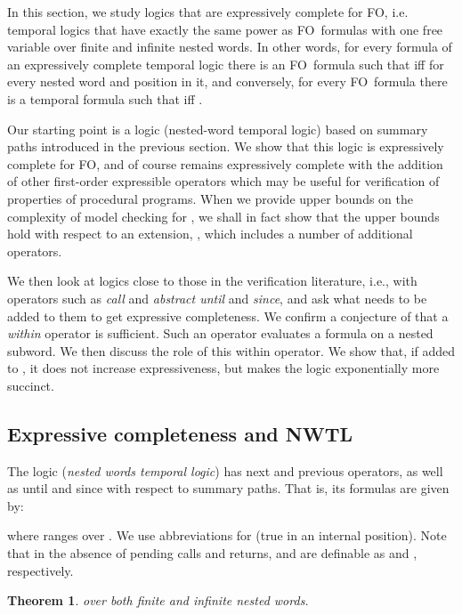 \documentclass{LMCS}
\newcommand{\FO}{{\rm FO}}
\theoremstyle{plain}
\newtheorem{theorem}{Theorem}[section]
\theoremstyle{definition}
\begin{document}
\noindent In this section, we study logics that are expressively complete for
\FO, i.e. temporal logics that have exactly the same power as \FO\
formulas with one free variable over finite and infinite nested words.
In other words, for every formula  of an expressively complete
temporal logic there is an \FO\ formula  such that
 iff  for every nested word 
and position  in it, and conversely, for every \FO\ formula  
there is a temporal formula  such that  iff
. 

Our starting point is a logic  (nested-word temporal logic) based
on summary paths introduced in the previous section. We show that this
logic is expressively complete for FO, and of course remains expressively
complete with the addition of other first-order expressible operators
which may be  useful for
verification of properties of procedural programs. 
When we provide upper bounds on the complexity of model checking
for , we shall in fact show that the upper bounds hold
with respect to an extension, ,  which includes
a number of additional operators.


We then look at logics close to those in the verification literature,
i.e., with operators such as {\em call} and {\em abstract until} and {\em since}, and ask
what needs to be added to them to get expressive completeness. We
confirm a conjecture of \cite{AEM04} that a {\em within} operator is
sufficient.  Such an operator evaluates a formula on a nested
subword.
We then discuss the role of this within operator. We show that, if
added to , it does not increase expressiveness, but makes the
logic exponentially more succinct.

\subsection{Expressive completeness and NWTL}

The logic  ({\em nested words temporal logic}) has next and
previous operators, as well as until and since with respect to summary
paths. That is, its formulas are given by:

where  ranges over . We use abbreviations
 for  (true in an internal
position). Note that in the absence of pending calls and returns,
 and  are definable as  and ,
respectively. 



\begin{theorem}
\label{nwtl-thm}
 over both finite and infinite nested words.
\end{theorem}
\end{document}
